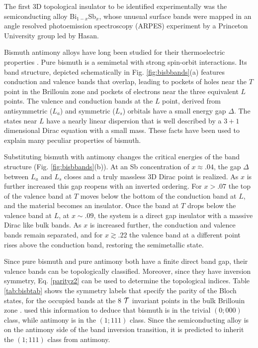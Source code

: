 \documentclass[twocolumn,floatfix,showpacs,rmp,aps]{revtex4}
\begin{document}
	The first 3D topological insulator to be identified experimentally
	was the semiconducting alloy
	Bi$_{1-x}$Sb$_{x}$, whose unusual surface bands were mapped in an
	angle resolved photoemission spectroscopy (ARPES) experiment by a Princeton
	University group led by Hasan\cite{hsieh08}.
	
	Bismuth antimony alloys have long been studied for their
	thermoelectric properties \cite{lenoir96}.  Pure bismuth is a semimetal with
	strong spin-orbit interactions.  Its band structure, depicted schematically in
	Fig. \ref{fig:bisbbands}(a) features conduction and valence bands that overlap,
	leading to pockets of holes near the $T$ point in the Brillouin zone
	and pockets of electrons near the three equivalent $L$ points.
	The valence and conduction bands at the $L$ point, derived
	from antisymmetric ($L_a$) and symmetric ($L_s$) orbitals have a small
	energy gap $\Delta$.  The states near $L$ have a nearly linear
	dispersion that is well described by a $3+1$
	dimensional Dirac equation \cite{wolff64} with a small mass.  These facts have been used to
	explain many peculiar properties of bismuth.
	
	Substituting bismuth with antimony changes the critical energies of
	the band structure (Fig. \ref{fig:bisbbands}(b)). At an Sb concentration of $x
	\approx .04$, the gap $\Delta$ between $L_a$ and $L_s$ closes and a
	truly massless 3D Dirac point is realized. As $x$ is
	further increased this gap reopens with an inverted ordering.
	For $x >.07$ the top of the valence band at $T$ moves below the bottom of the conduction
	band at $L$, and the material becomes an
	insulator. Once the band at $T$ drops below the valence band at $L$, at
	$x\sim .09$, the system is a direct gap insulator with
	a massive Dirac like bulk bands.  As $x$ is increased further, the conduction
	and valence bands remain separated, and for $x \gtrsim .22$ the valence band at
	a different point rises above the conduction band, restoring the semimetallic
	state.
	
	Since pure bismuth and pure antimony both have a finite direct band gap, their
	valence bands can be topologically classified.  Moreover, since they have
	inversion symmetry, Eq. \ref{parityz2} can be used to determine the topological indices.
	Table \ref{tab:bisbtab} shows the symmetry labels that specify the parity
	of the Bloch states, for the occupied bands at the 8
	${\cal T}$ invariant points in the bulk Brillouin zone \cite{liuallen95}.
	\textcite{fukane07} used this information to deduce
	that bismuth is in the trivial $(0;000)$ class, while antimony is in the
	$(1;111)$ class.  Since the semiconducting alloy is on the antimony side of the
	band inversion transition, it is predicted to inherit the $(1;111)$ class from
	antimony.
	
\end{document}
